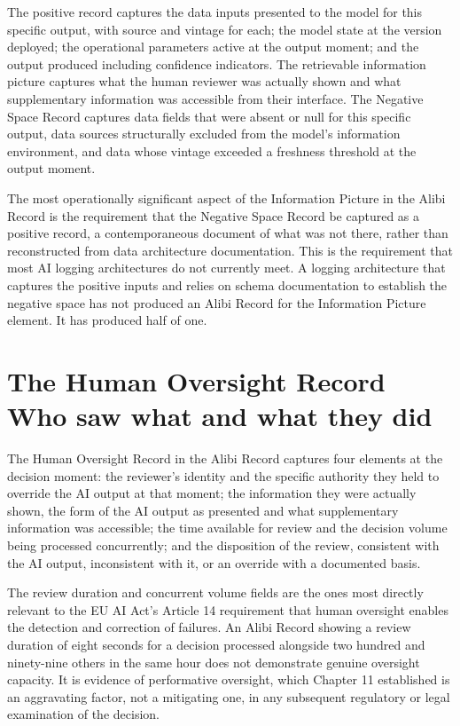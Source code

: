 The positive record captures the data inputs presented to the model for this specific output, with source and vintage for each; the model state at the version deployed; the operational parameters active at the output moment; and the output produced including confidence indicators. The retrievable information picture captures what the human reviewer was actually shown and what supplementary information was accessible from their interface. The Negative Space Record captures data fields that were absent or null for this specific output, data sources structurally excluded from the model's information environment, and data whose vintage exceeded a freshness threshold at the output moment.

The most operationally significant aspect of the Information Picture in the Alibi Record is the requirement that the Negative Space Record be captured as a positive record, a contemporaneous document of what was not there, rather than reconstructed from data architecture documentation. This is the requirement that most AI logging architectures do not currently meet. A logging architecture that captures the positive inputs and relies on schema documentation to establish the negative space has not produced an Alibi Record for the Information Picture element. It has produced half of one.

\section{The Human Oversight Record Who saw what and what they did}

The Human Oversight Record in the Alibi Record captures four elements at the decision moment: the reviewer's identity and the specific authority they held to override the AI output at that moment; the information they were actually shown, the form of the AI output as presented and what supplementary information was accessible; the time available for review and the decision volume being processed concurrently; and the disposition of the review, consistent with the AI output, inconsistent with it, or an override with a documented basis.

The review duration and concurrent volume fields are the ones most directly relevant to the EU AI Act's Article 14 requirement that human oversight enables the detection and correction of failures. An Alibi Record showing a review duration of eight seconds for a decision processed alongside two hundred and ninety-nine others in the same hour does not demonstrate genuine oversight capacity. It is evidence of performative oversight, which Chapter 11 established is an aggravating factor, not a mitigating one, in any subsequent regulatory or legal examination of the decision.

